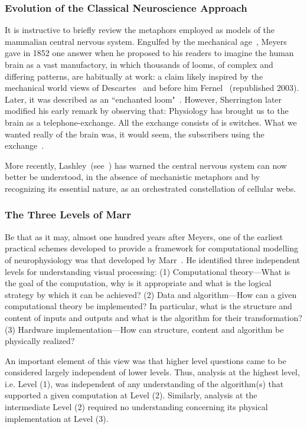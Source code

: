 \documentclass[10pt,letterpaper]{article}
\begin{document}
\subsubsection*{Evolution of the Classical Neuroscience Approach}

It is instructive to briefly review the metaphors employed as models of the mammalian central nervous system. Engulfed by the mechanical age~\cite{carlyle52}, Meyers~\cite{meyers87} gave in 1852 one answer when he proposed to his readers to imagine the human brain as a vast manufactory, in which thousands of looms, of complex and differing patterns, are habitually at work: a claim likely inspired by the mechanical world views of Descartes~\cite{descartes62} and before him Fernel~\cite{fernel67} (republished 2003). Later, it was described as an ``enchanted loom"~\cite{sherrington53}. However, Sherrington later modified his early remark by observing that: Physiology has brought us to the brain as a telephone-exchange. All the exchange consists of is switches. What we wanted really of the brain was, it would seem, the subscribers using the exchange~\cite{sherrington53}.

More recently, Lashley~(see~\cite{jorgensen21}) has warned the central nervous system can now better be understood, in the absence of mechanistic metaphors and by recognizing its essential nature, as an orchestrated constellation of cellular webs.

\subsubsection*{The Three Levels of Marr}

Be that as it may, almost one hundred years after Meyers, one of the earliest practical schemes developed to provide a framework for computational modelling of neurophysiology was that developed by Marr~\cite{Marr:1982fk}. He identified three independent levels for understanding visual processing: (1) Computational theory---What is the goal of the computation, why is it appropriate and what is the logical strategy by which it can be achieved? (2) Data and algorithm---How can a given computational theory be implemented? In particular, what is the structure and content of inputs and outputs and what is the algorithm for their transformation? (3) Hardware implementation---How can structure, content and algorithm be physically realized?

An important element of this view was that higher level questions came to be considered largely independent of lower levels. Thus, analysis at the highest level, i.e. Level (1), was independent of any understanding of the algorithm(s) that supported a given computation at Level (2). Similarly, analysis at the intermediate Level (2) required no understanding concerning its physical implementation at Level (3).
\end{document}
